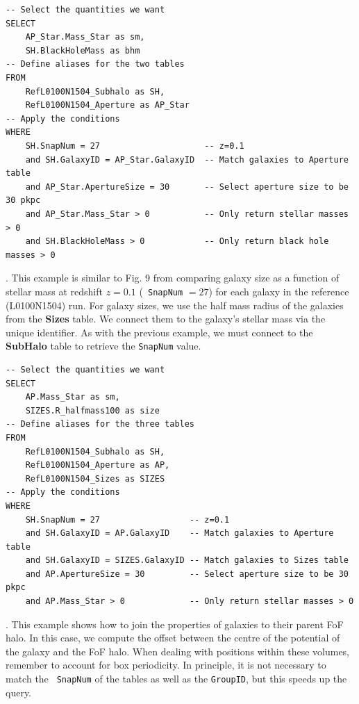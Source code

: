 \sqlstyle
\footnotesize
\begin{lstlisting}[numbers = none]
-- Select the quantities we want
SELECT      
	AP_Star.Mass_Star as sm,      
	SH.BlackHoleMass as bhm
-- Define aliases for the two tables      
FROM      
	RefL0100N1504_Subhalo as SH,      
	RefL0100N1504_Aperture as AP_Star
-- Apply the conditions        
WHERE      
	SH.SnapNum = 27                     -- z=0.1
	and SH.GalaxyID = AP_Star.GalaxyID  -- Match galaxies to Aperture table
	and AP_Star.ApertureSize = 30       -- Select aperture size to be 30 pkpc
	and AP_Star.Mass_Star > 0           -- Only return stellar masses > 0
	and SH.BlackHoleMass > 0            -- Only return black hole masses > 0
\end{lstlisting}

\normalsize
{}. This example
         is similar to Fig. 9 from \citet{Schaye2015} comparing galaxy
         size as a function of stellar mass at redshift $z=0.1$ ({\tt
         SnapNum} $=27$) for each galaxy in the reference (L0100N1504)
         run. For galaxy sizes, we use the half mass radius of the
         galaxies from the {\bf Sizes} table. We
         connect them to the galaxy's stellar mass via the
         unique \GalaxyID identifier. As with the previous example, we
         must connect to the {\bf SubHalo} table to
         retrieve the {\tt SnapNum} value.

\sqlstyle
\footnotesize
\begin{lstlisting}[numbers = none]
-- Select the quantities we want
SELECT 
	AP.Mass_Star as sm, 
	SIZES.R_halfmass100 as size 
-- Define aliases for the three tables
FROM 
	RefL0100N1504_Subhalo as SH, 
	RefL0100N1504_Aperture as AP, 
	RefL0100N1504_Sizes as SIZES 
-- Apply the conditions
WHERE 
	SH.SnapNum = 27                  -- z=0.1
	and SH.GalaxyID = AP.GalaxyID    -- Match galaxies to Aperture table
	and SH.GalaxyID = SIZES.GalaxyID -- Match galaxies to Sizes table
	and AP.ApertureSize = 30         -- Select aperture size to be 30 pkpc
	and AP.Mass_Star > 0             -- Only return stellar masses > 0
\end{lstlisting}
\pagebreak

\normalsize
{}. 
This example shows how to join the properties of galaxies to their
parent FoF halo. In this case, we compute the offset between the
centre of the potential of the galaxy and the FoF halo. When dealing 
with positions within these volumes, remember to account for box
periodicity. In principle, it is not necessary to match the {\tt
SnapNum} of the tables as well as the {\tt GroupID}, but this
speeds up the query.

